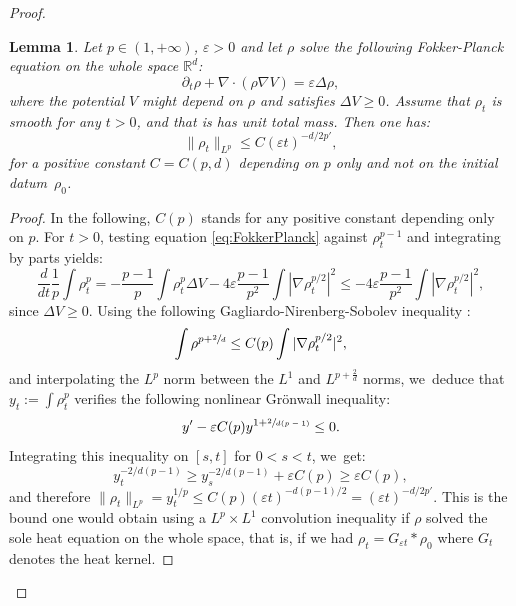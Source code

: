 \documentclass[11pt]{article}
\numberwithin{equation}{section}
\def\RR{\mathbb{R}}
\def\eps{\varepsilon}
\def\pa{\partial}
\theoremstyle{plain}
\newtheorem{lemma}[theorem]{Lemma}
\theoremstyle{definition}
\begin{document}
\begin{proof}
\begin{lemma}\label{lemma:LpBoundRho}
Let $p \in (1,+\infty)$, $\eps > 0$ and let $\rho$ solve the following Fokker-Planck equation on the whole space $\RR^d$:
\begin{equation}\label{eq:FokkerPlanck}
\pa_t \rho + \nabla \cdot (\rho \nabla V) = \eps \Delta \rho,
\end{equation}
where the potential $V$ might depend on $\rho$ and satisfies $\Delta V \geq 0$. Assume that $\rho_t$ is smooth for any $t>0$, and that is has unit total mass. Then one has:
\[
\|\rho_t\|_{L^p} \leq C(\eps t)^{-d/2p'},
\]
for a positive constant $C=C(p,d)$ depending on $p$ only and not on the initial datum~$\rho_0$.
\end{lemma}
\begin{proof}
In the following, $C(p)$ stands for any positive constant depending only on $p$. For $t>0$, testing equation \eqref{eq:FokkerPlanck} against $\rho_t^{p-1}$ and integrating by parts yields:
\[
\frac{d}{dt} \frac 1p \int \rho_t^p = - \frac{p-1}{p} \int \rho_t^p \Delta V - 4 \eps \frac{p-1}{p^2} \int |\nabla \rho_t^{p/2}|^2 \leq - 4 \eps \frac{p-1}{p^2} \int |\nabla \rho_t^{p/2}|^2,
\]
since $\Delta V \geq 0$. Using the following Gagliardo-Nirenberg-Sobolev inequality \cite{gagliardo59, nirenberg59}:
\[
\int \rho^{p+\sfrac 2d} \leq C(p) \int |\nabla \rho_t^{p/2}|^2,
\]
and interpolating the $L^p$ norm between the $L^1$ and $L^{p+\frac 2d}$ norms, we~deduce that $y_t := \int \rho_t^p$ verifies the following nonlinear Grönwall inequality:
\[
y' - \eps C(p) y^{1+\sfrac{2}{d(p-1)}} \leq 0.
\]
Integrating this inequality on $[s,t]$ for $0<s<t$, we~get:
\[
y_t^{-2/d(p-1)} \geq y_s^{-2/d(p-1)} + \eps C(p) \geq \eps C(p),
\]
and therefore $\|\rho_t\|_{L^p} = y_t^{1/p} \leq C(p) (\eps t)^{-d(p-1)/2} = (\eps t)^{-d/2p'}$. This is the bound one would obtain using a $L^p \times L^1$ convolution inequality if $\rho$ solved the sole heat equation on the whole space, that is, if we had $\rho_t = G_{\eps t} * \rho_0$ where $G_t$ denotes the heat kernel.
\end{proof}


\end{proof}
\end{document}

